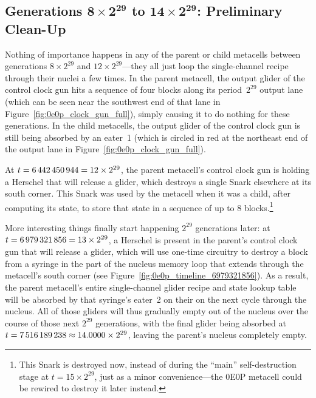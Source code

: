 \subsection{Generations $\mathbf{8 \times 2^{29}}$ to $\mathbf{14 \times 2^{29}}$: Preliminary Clean-Up}\label{sec:0e0p_timeline_prelim_cleanup}

Nothing of importance happens in any of the parent or child metacells between generations $8 \times 2^{29}$ and $12 \times 2^{29}$---they all just loop the single-channel recipe through their nuclei a few times. In the parent metacell, the output glider of the control clock gun hits a sequence of four blocks along its period~$2^{29}$ output lane (which can be seen near the southwest end of that lane in Figure~\ref{fig:0e0p_clock_gun_full}), simply causing it to do nothing for these generations. In the child metacells, the output glider of the control clock gun is still being absorbed by an eater~1 (which is circled in red at the northeast end of the output lane in Figure~\ref{fig:0e0p_clock_gun_full}).

At $t = 6{\,}442{\,}450{\,}944 = 12 \times 2^{29}$, the parent metacell's control clock gun is holding a Herschel that will release a glider, which destroys a single Snark elsewhere at its south corner. This Snark was used by the metacell when it was a child, after computing its state, to store that state in a sequence of up to 8 blocks.\footnote{This Snark is destroyed now, instead of during the ``main'' self-destruction stage at $t = 15 \times 2^{29}$, just as a minor convenience---the 0E0P metacell could be rewired to destroy it later instead.}

More interesting things finally start happening $2^{29}$ generations later: at $t = 6{\,}979{\,}321{\,}856 = 13 \times 2^{29}$, a Herschel is present in the parent's control clock gun that will release a glider, which will use one-time circuitry to destroy a block from a syringe in the part of the nucleus memory loop that extends through the metacell's south corner (see Figure~\ref{fig:0e0p_timeline_6979321856}). As a result, the parent metacell's entire single-channel glider recipe and state lookup table will be absorbed by that syringe's eater~2 on their on the next cycle through the nucleus. All of those gliders will thus gradually empty out of the nucleus over the course of those next $2^{29}$ generations, with the final glider being absorbed at $t = 7{\,}516{\,}189{\,}238 \approx 14.0000 \times 2^{29}$, leaving the parent's nucleus completely empty.

